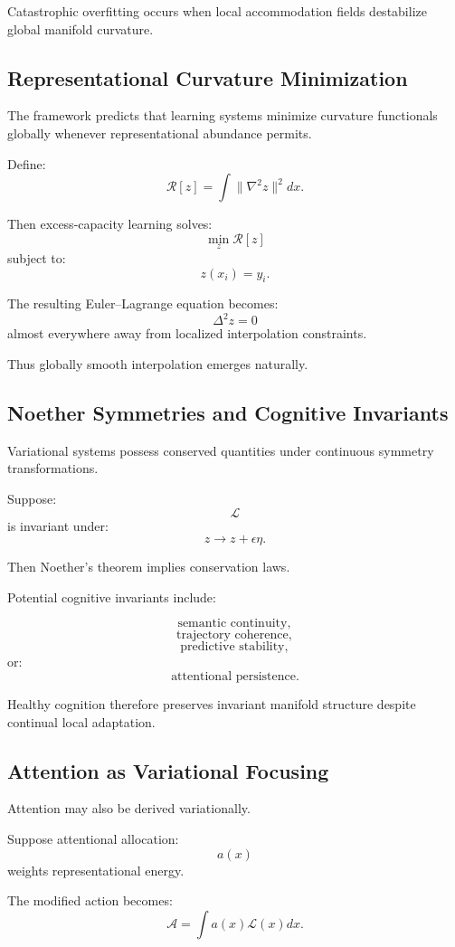 \documentclass[12pt,a4paper]{article}
\begin{document}
Catastrophic overfitting occurs when local accommodation fields destabilize global manifold curvature.

\subsection{Representational Curvature Minimization}

The framework predicts that learning systems minimize curvature functionals globally whenever representational abundance permits.

Define:
\[
\mathcal{R}[z]
=
\int
\|\nabla^2 z\|^2
dx.
\]

Then excess-capacity learning solves:
\[
\min_z
\mathcal{R}[z]
\]
subject to:
\[
z(x_i)=y_i.
\]

The resulting Euler--Lagrange equation becomes:
\[
\Delta^2 z
=
0
\]
almost everywhere away from localized interpolation constraints.

Thus globally smooth interpolation emerges naturally.

\subsection{Noether Symmetries and Cognitive Invariants}

Variational systems possess conserved quantities under continuous symmetry transformations.

Suppose:
\[
\mathcal{L}
\]
is invariant under:
\[
z
\rightarrow
z+\epsilon \eta.
\]

Then Noether's theorem implies conservation laws.

Potential cognitive invariants include:

\[
\text{semantic continuity},
\]
\[
\text{trajectory coherence},
\]
\[
\text{predictive stability},
\]
or:
\[
\text{attentional persistence}.
\]

Healthy cognition therefore preserves invariant manifold structure despite continual local adaptation.

\subsection{Attention as Variational Focusing}

Attention may also be derived variationally.

Suppose attentional allocation:
\[
a(x)
\]
weights representational energy.

The modified action becomes:
\[
\mathcal{A}
=
\int
a(x)
\mathcal{L}(x)
dx.
\]
\end{document}
